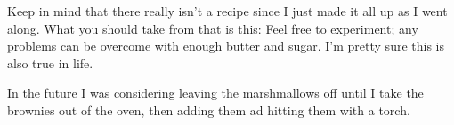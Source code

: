 \begin{experiments}
\item Keep in mind that there really isn't a recipe since I just made it all up as I went along. What you should take from that is this: Feel free to experiment; any problems can be overcome with enough butter and sugar. I'm pretty sure this is also true in life.

\item In the future I was considering leaving the marshmallows off until I take the brownies out of the oven, then adding them ad hitting them with a torch.
\end{experiments}
\recipeend
